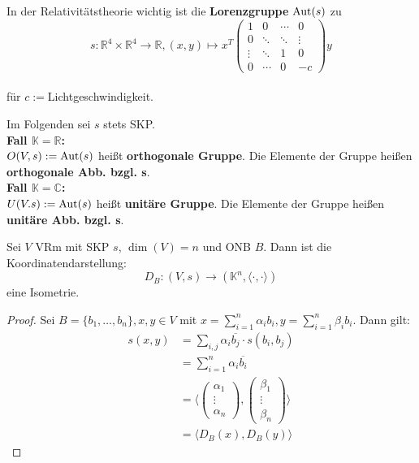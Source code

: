 \documentclass[parskip,a4paper,twoside,DIV15,BCOR12mm]{scrbook}
\begin{document}
\begin{example}
In der Relativitätstheorie wichtig ist die \textbf{Lorenzgruppe} $\operatorname{Aut}(s)$ zu\\
\[s:\mathbb{R}^4 \times \mathbb{R}^4 \to\mathbb{R}, (x,y)\mapsto x^T
\begin{pmatrix}
1&0&\cdots&0\\
0&\ddots&\ddots&\vdots\\
\vdots&\ddots&1&0\\
0&\cdots&0&-c
\end{pmatrix}
y\]\\ 
für $c:=$Lichtgeschwindigkeit.
\end{example}

\begin{definition}
Im Folgenden sei $s$ stets SKP.\\
\textbf{Fall $\mathbb{K}=\mathbb{R}$:}\\
$O(V,s):=\operatorname{Aut}(s)$ heißt \textbf{orthogonale Gruppe}. Die Elemente der Gruppe
heißen \textbf{orthogonale Abb. bzgl. s}.\\
\textbf{Fall $\mathbb{K}=\mathbb{C}$:}\\
$U(V.s):=\operatorname{Aut}(s)$ heißt \textbf{unitäre Gruppe}. Die Elemente der Gruppe heißen
\textbf{unitäre Abb. bzgl. s}.
\end{definition}

\begin{comment}
Eine wichtige Isometrie ist: abstrakter VRm $\cong$ Standartraum
\end{comment}

\begin{theo}
Sei $V$ VRm mit SKP $s$, $\dim(V)=n$ und ONB $B$. Dann ist die Koordinatendarstellung:\\
\[D_B:(V,s)\to(\mathbb{K}^n,\langle\cdot,\cdot\rangle)\] eine Isometrie.
\end{theo}

\begin{proof}
Sei $B=\{b_1,\ldots,b_n\}, x,y\in V$ mit $x=\sum_{i=1}^n{\alpha_i b_i},
y=\sum_{i=1}^n{\beta_i b_i}$. Dann gilt:
\begin{align*}
s(x,y)&=\sum_{i,j}{\alpha_i \overline{b_j}\cdot s(b_i,b_j)}\\
&= \sum_{i=1}^n{\alpha_i \overline{b_i}}\\
&= \langle
\begin{pmatrix}
\alpha_1\\
\vdots\\
\alpha_n
\end{pmatrix},
\begin{pmatrix}
\beta_1\\
\vdots\\
\beta_n
\end{pmatrix} 
\rangle\\
&= \langle D_B(x),D_B(y)\rangle
\end{align*}
\end{proof}
\end{document}
